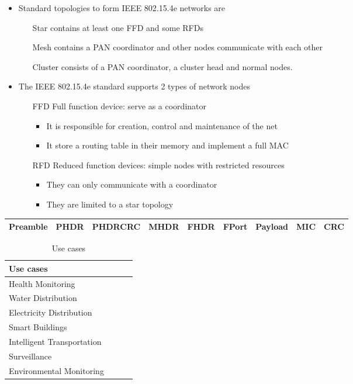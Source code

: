 \begin{itemize}
	\item Standard topologies to form IEEE 802.15.4e networks are 
	\begin{itemize}
		\item[Star] contains at least one FFD and some RFDs
		\item[Mesh] contains a PAN coordinator and other nodes communicate with each other
		\item[Cluster] consists of a PAN coordinator, a cluster head and normal nodes.
	\end{itemize}
	\item The IEEE 802.15.4e standard supports 2 types of network nodes
	\begin{itemize}
		\item[FFD] Full function device: serve as a coordinator
		\begin{itemize}
			\item It is responsible for creation, control and maintenance of the net
			\item It store a routing table in their memory and implement a full MAC
		\end{itemize}
		\item[RFD] Reduced function devices: simple nodes with restricted resources
		\begin{itemize}
			\item They can only communicate with a coordinator
			\item They are limited to a star topology
		\end{itemize}
	\end{itemize}
\end{itemize}

\begin{tabulary}{\textwidth}{|C|C|C|C|C|C|C|C|C|}\hline
	Preamble & PHDR & PHDRCRC & MHDR & FHDR & FPort & Payload & MIC & CRC \\\hline
\end{tabulary}

\begin{table}[h!]
\scriptsize
	\begin{tabular}{l|l|l|l}
	\textbf{Use cases}         &  &  & \\\hline
	Health Monitoring          &  &  & \\\hline
	Water Distribution         &  &  & \\\hline
	Electricity Distribution   &  &  & \\\hline
	Smart Buildings            &  &  & \\\hline
	Intelligent Transportation &  &  & \\\hline
	Surveillance               &  &  & \\\hline
	Environmental Monitoring   &  &  & \\
	\end{tabular}
	\caption{\label{tab:IoTUseCase} Use cases \cite{hancke_role_2012}}
\end{table}

